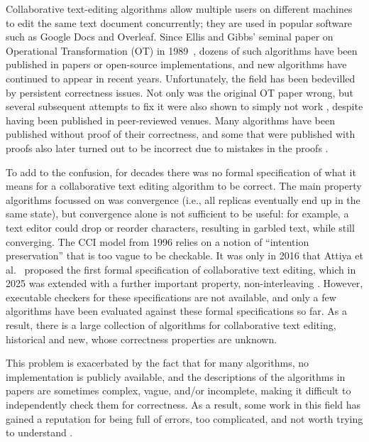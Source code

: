\documentclass[sigplan,10pt,review,anonymous]{acmart}
\begin{document}
Collaborative text-editing algorithms allow multiple users on different machines to edit the same text document concurrently; they are used in popular software such as Google Docs and Overleaf.
Since Ellis and Gibbs' seminal paper on Operational Transformation (OT) in 1989~\cite{Ellis1989}, dozens of such algorithms have been published in papers or open-source implementations, and new algorithms have continued to appear in recent years.
Unfortunately, the field has been bedevilled by persistent correctness issues.
Not only was the original OT paper wrong, but several subsequent attempts to fix it were also shown to simply not work \cite{Oster2005Proving}, despite having been published in peer-reviewed venues. 
Many algorithms have been published without proof of their correctness, and some that were published with proofs also later turned out to be incorrect due to mistakes in the proofs \cite{Oster2005Proving}.

To add to the confusion, for decades there was no formal specification of what it means for a collaborative text editing algorithm to be correct.
The main property algorithms focussed on was convergence (i.e., all replicas eventually end up in the same state), but convergence alone is not sufficient to be useful: for example, a text editor could drop or reorder characters, resulting in garbled text, while still converging.
The CCI model from 1996 \cite{Sun1996} relies on a notion of ``intention preservation'' that is too vague to be checkable.
It was only in 2016 that Attiya et al.~\cite{Attiya2016} proposed the first formal specification of collaborative text editing, which in 2025 was extended with a further important property, non-interleaving \cite{Weidner2025Fugue}.
However, executable checkers for these specifications are not available, and only a few algorithms have been evaluated against these formal specifications so far.
As a result, there is a large collection of algorithms for collaborative text editing, historical and new, whose correctness properties are unknown.

This problem is exacerbated by the fact that for many algorithms, no implementation is publicly available, and the descriptions of the algorithms in papers are sometimes complex, vague, and/or incomplete, making it difficult to independently check them for correctness.
As a result, some work in this field has gained a reputation for being full of errors, too complicated, and not worth trying to understand \cite{Gentle2011,Levien2019}.
\end{document}
